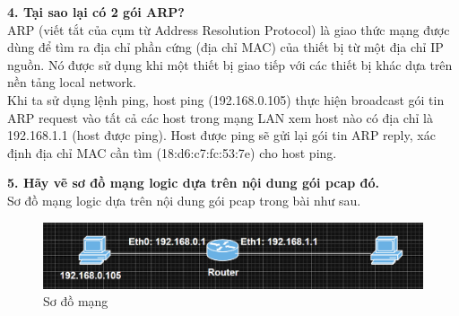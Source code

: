 \textbf{4.	Tại sao lại có 2 gói ARP?}\\
ARP (viết tắt của cụm từ Address Resolution Protocol) là giao thức mạng được dùng để tìm ra địa chỉ phần cứng (địa chỉ MAC) của thiết bị từ một địa chỉ IP nguồn. Nó được sử dụng khi một thiết bị giao tiếp với các thiết bị khác dựa trên nền tảng local network.\\
Khi ta sử dụng lệnh ping, host ping (192.168.0.105) thực hiện broadcast gói tin ARP request vào tất cả các host trong mạng LAN xem host nào có địa chỉ là 192.168.1.1 (host được ping). Host được ping sẽ gửi lại gói tin ARP reply, xác định địa chỉ MAC cần tìm (18:d6:c7:fc:53:7e) cho host ping.

\textbf{5.	Hãy vẽ sơ đồ mạng logic dựa trên nội dung gói pcap đó.} \\
Sơ đồ mạng logic dựa trên nội dung gói pcap trong bài như sau.
\begin{figure}[H]
\begin{center}
\includegraphics[scale=.75]{../figures/p1/p1_lan}
\end{center}
\caption{Sơ đồ mạng}
\end{figure}